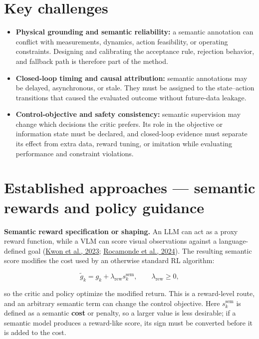 \documentclass[a4paper]{article}
\begin{document}
\section{Key challenges}

\begin{itemize}
  \item \textbf{Physical grounding and semantic reliability:} a semantic annotation can
  conflict with measurements, dynamics, action feasibility, or operating
  constraints. Designing and calibrating the acceptance rule, rejection
  behavior, and fallback path is therefore part of the method.
  \item \textbf{Closed-loop timing and causal attribution:} semantic annotations may be
  delayed, asynchronous, or stale. They must be assigned to the state--action
  transitions that caused the evaluated outcome without future-data leakage.
  \item \textbf{Control-objective and safety consistency:} semantic supervision may
  change which decisions the critic prefers. Its role in the objective or
  information state must be declared, and closed-loop evidence must separate
  its effect from extra data, reward tuning, or imitation while evaluating
  performance and constraint violations.
\end{itemize}

\section{Established approaches --- semantic rewards and policy guidance}

\textbf{Semantic reward specification or shaping.} An LLM can act as a proxy reward
function, while a VLM can score visual observations against a language-defined
goal (\href{https://openreview.net/forum?id=10uNUgI5Kl}{Kwon et al., 2023};
\href{https://proceedings.iclr.cc/paper_files/paper/2024/hash/7a7f6cc5dc2a84fb4edf0feb8e5cfd50-Abstract-Conference.html}{Rocamonde et al., 2024}).
The resulting semantic score modifies the cost used by an otherwise standard
RL algorithm:

\begin{equation}
\widetilde g_k
=
g_k+\lambda_{\mathrm{rew}}s_k^{\mathrm{sem}},
\qquad
\lambda_{\mathrm{rew}}\ge0,
\end{equation}

so the critic and policy optimize the modified return. This is a reward-level
route, and an arbitrary semantic term can change the control objective. Here
$s_k^{\mathrm{sem}}$ is defined as a semantic \textbf{cost} or penalty, so a larger
value is less desirable; if a semantic model produces a reward-like score,
its sign must be converted before it is added to the cost.
\end{document}
